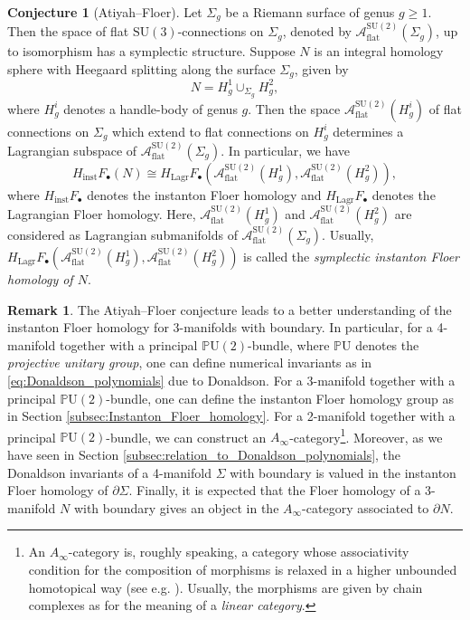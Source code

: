 \documentclass[11pt,colorinlistoftodos]{amsart}
\numberwithin{equation}{subsection}
\theoremstyle{plain}
\theoremstyle{definition}
\newtheorem{Conj}[thm]{Conjecture}
\newtheorem{rem}[thm]{Remark}
\theoremstyle{remark}
\newcommand{\de}{\partial}
\newcommand{\calA}{\mathcal{A}}
\begin{document}
\begin{Conj}[Atiyah--Floer\cite{Atiyah1987}]\label{conj:Atiyah-Floer}
Let $\Sigma_g$ be a Riemann surface of genus $g\geq 1$. Then the space of flat $\mathrm{SU}(3)$-connections on $\Sigma_g$, denoted by $\calA_\mathrm{flat}^{\mathrm{SU}(2)}(\Sigma_g)$, up to isomorphism has a symplectic structure. Suppose $N$ is an integral homology sphere with Heegaard splitting along the surface $\Sigma_g$, given by 
\[
N=H^1_g\cup_{\Sigma_g} H_g^2,
\]
where $H^i_g$ denotes a handle-body of genus $g$. Then the space $\calA_\mathrm{flat}^{\mathrm{SU}(2)}(H^i_g)$ of flat connections on $\Sigma_g$ which extend to flat connections on $H^i_g$ determines a Lagrangian subspace of $\calA_\mathrm{flat}^{\mathrm{SU}(2)}(\Sigma_g)$. In particular, we have 
\[
H_\mathrm{inst}F_\bullet(N)\cong H_\mathrm{Lagr}F_\bullet(\calA_\mathrm{flat}^{\mathrm{SU}(2)}(H^1_g),\calA_\mathrm{flat}^{\mathrm{SU}(2)}(H^2_g)),
\]
where $H_\mathrm{inst}F_\bullet$ denotes the instanton Floer homology and $H_\mathrm{Lagr}F_\bullet$ denotes the Lagrangian Floer homology. Here, $\calA_\mathrm{flat}^{\mathrm{SU}(2)}(H^1_g)$ and $\calA_\mathrm{flat}^{\mathrm{SU}(2)}(H^2_g)$ are considered as Lagrangian submanifolds of $\calA_\mathrm{flat}^{\mathrm{SU}(2)}(\Sigma_g)$. Usually, $H_\mathrm{Lagr}F_\bullet(\calA_\mathrm{flat}^{\mathrm{SU}(2)}(H^1_g),\calA_\mathrm{flat}^{\mathrm{SU}(2)}(H^2_g))$ is called the \emph{symplectic instanton Floer homology of $N$}.
\end{Conj}

\begin{rem}
The Atiyah--Floer conjecture leads to a better understanding of the instanton Floer homology for 3-manifolds with boundary. In particular, for a 4-manifold together with a principal $\mathbb{P}\mathrm{U}(2)$-bundle, where $\mathbb{P}\mathrm{U}$ denotes the \emph{projective unitary group}, one can define numerical invariants as in \eqref{eq:Donaldson_polynomials} due to Donaldson. For a 3-manifold together with a principal $\mathbb{P}\mathrm{U}(2)$-bundle, one can define the instanton Floer homology group as in Section \ref{subsec:Instanton_Floer_homology}. For a 2-manifold together with a principal $\mathbb{P}\mathrm{U}(2)$-bundle, we can construct an $A_\infty$-category\footnote{An $A_\infty$-category is, roughly speaking, a category whose associativity condition for the composition of morphisms is relaxed in a higher unbounded homotopical way (see e.g. \cite{KontsevichSoibelman2008}). Usually, the morphisms are given by chain complexes as for the meaning of a \emph{linear category}.}. Moreover, as we have seen in Section \ref{subsec:relation_to_Donaldson_polynomials}, the Donaldson invariants of a 4-manifold $\Sigma$ with boundary is valued in the instanton Floer homology of $\de\Sigma$. Finally, it is expected that the Floer homology of a 3-manifold $N$ with boundary gives an object in the $A_\infty$-category associated to $\de N$.
\end{rem}
\end{document}
